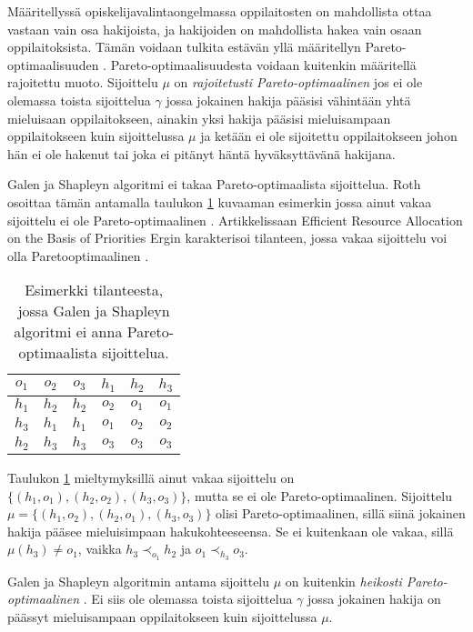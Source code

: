 \documentclass[gradu, twoside]{tktltiki}
\begin{document}
Määritellyssä opiskelijavalintaongelmassa oppilaitosten on mahdollista
ottaa vastaan vain osa hakijoista, ja hakijoiden on mahdollista hakea
vain osaan oppilaitoksista. Tämän voidaan tulkita estävän yllä
määritellyn Pareto-optimaalisuuden \cite{kojima10}.
Pareto-optimaalisuudesta voidaan kuitenkin määritellä rajoitettu
muoto. Sijoittelu $\mu$ on \emph{rajoitetusti Pareto-optimaalinen} jos
ei ole olemassa toista sijoittelua $\gamma$ jossa jokainen hakija
pääsisi vähintään yhtä mieluisaan oppilaitokseen, ainakin yksi hakija
pääsisi mieluisampaan oppilaitokseen kuin sijoittelussa $\mu$ ja
ketään ei ole sijoitettu oppilaitokseen johon hän ei ole hakenut tai
joka ei pitänyt häntä hyväksyttävänä hakijana.

Galen ja Shapleyn algoritmi ei takaa Pareto-optimaalista sijoittelua.
Roth osoittaa tämän antamalla taulukon \ref{roth_optimaalisuus}
kuvaaman esimerkin jossa ainut vakaa sijoittelu ei ole
Pareto-optimaalinen \cite{roth82}. Artikkelissaan Efficient Resource
Allocation on the Basis of Priorities Ergin karakterisoi tilanteen,
jossa vakaa sijoittelu voi olla Pareto\hyph optimaalinen
\cite{ergin02}.

\begin{table}[ht]
  \begin{center}
    \begin{tabular}{ c c c | c c c }
      $o_1$ & $o_2$ & $o_3$ & $h_1$ & $h_2$ & $h_3$ \\
      \hline
      $h_1$ & $h_2$ & $h_2$ & $o_2$ & $o_1$ & $o_1$ \\
      $h_3$ & $h_1$ & $h_1$ & $o_1$ & $o_2$ & $o_2$ \\
      $h_2$ & $h_3$ & $h_3$ & $o_3$ & $o_3$ & $o_3$
    \end{tabular}
    \caption{Esimerkki tilanteesta, jossa Galen ja Shapleyn algoritmi ei
      anna Pareto-optimaalista sijoittelua.}
    \label{roth_optimaalisuus}
  \end{center}
\end{table}

Taulukon \ref{roth_optimaalisuus} mieltymyksillä ainut vakaa
sijoittelu on $\{(h_1, o_1), (h_2, o_2), (h_3, o_3)\}$, mutta se ei
ole Pareto-optimaalinen. Sijoittelu $\mu = \{(h_1, o_2), (h_2, o_1),
(h_3, o_3)\}$ olisi Pareto-optimaalinen, sillä siinä jokainen hakija
pääsee mieluisimpaan hakukohteeseensa. Se ei kuitenkaan ole vakaa,
sillä $\mu(h_3) \neq o_1$, vaikka $h_3 \prec_{o_1} h_2$ ja $o_1
\prec_{h_3} o_3$.

Galen ja Shapleyn algoritmin antama sijoittelu $\mu$ on kuitenkin
\emph{heikosti Pareto-optimaalinen} \cite{gusfield89}. Ei siis ole
olemassa toista sijoittelua $\gamma$ jossa jokainen hakija on päässyt
mieluisampaan oppilaitokseen kuin sijoittelussa $\mu$.
\end{document}
